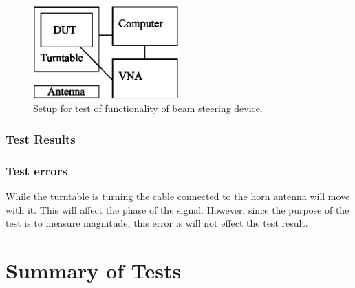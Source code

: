 \begin{figure}[H]
    \centering
    \includegraphics[width=0.5\textwidth]{figures/accept-test-setup.eps}
    \caption{Setup for test of functionality of beam steering device.} \label{fig:experiment-setup}
\end{figure}

\subsubsection{Test Results}

\subsubsection{Test errors}
While the turntable is turning the cable connected to the horn antenna will move with it. This will affect the phase of the signal. However, since the purpose of the test is to measure magnitude, this error is will not effect the test result.

\section{Summary of Tests}